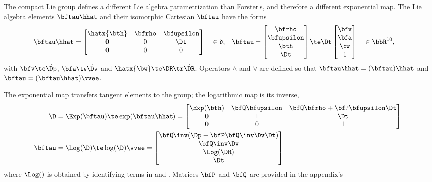 The compact Lie group defines a different Lie algebra parametrization than Forster's, and therefore a different exponential map.
The Lie algebra elements $\bftau\hhat$ and their isomorphic Cartesian $\bftau$ have the forms
%
\begin{align}
    \label{equ:lie_algebra}
    \bftau\hhat &= \begin{bmatrix}
    \hatx{\bth} & \bfrho & \bfupsilon \\
    \bf0 & 0 & \Dt \\
    \bf0 & 0 & 0
    \end{bmatrix} ~~~\in \mathfrak{d}
    ,&
    \bftau &= \begin{bmatrix}
    \bfrho \\ \bfupsilon \\ \bth \\ \Dt
    \end{bmatrix}
    \te \Dt \begin{bmatrix}
    \bfv \\ \bfa \\ \bw \\ 1
    \end{bmatrix} 
    ~~~\in \bbR^{10}
    ,
\end{align}
%
with $\bfv\te\dot\Dp$, $\bfa\te\dot\Dv$ and $\hatx{\bw}\te\DR\tr\dot\DR$.
Operators $\wedge$ and $\vee$ are defined so that $\bftau\hhat=(\bftau)\hhat$ and $\bftau=(\bftau\hhat)\vvee$.

The exponential map transfers tangent elements to the group; the logarithmic map is its inverse,
%
\begin{align}
    \D &= \Exp(\bftau) \te \exp(\bftau\hhat) = \begin{bmatrix}
    \Exp(\bth) & \bfQ\bfupsilon & \bfQ\bfrho+\bfP\bfupsilon\Dt \\
    \bf0 & 1 & \Dt \\
    \bf0 & 0 & 1
    \end{bmatrix} %
    \label{eq:compact_exp}
    \\
    \bftau &= \Log(\D) \te \log(\D)\vvee = \begin{bmatrix}
    \bfQ\inv(\Dp-\bfP\bfQ\inv\Dv\Dt) \\
    \bfQ\inv\Dv \\
    \Log(\DR) \\
    \Dt 
    \end{bmatrix} %
    \label{eq:compact_log}
\end{align}
%
where $\Log()$ is obtained by identifying terms in  and .
Matrices $\bfP$ and $\bfQ$ are provided in the appendix's .


